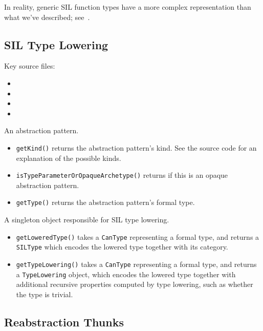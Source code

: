 \documentclass[../generics]{subfiles}
\begin{document}
In reality, generic SIL function types have a more complex representation than what we've described; see~\cite{substfunctype}.

\subsection*{SIL Type Lowering}

Key source files:
\begin{itemize}
\item {}
\item {}
\item {}
\item {}
\end{itemize}

An abstraction pattern.
\begin{itemize}
\item \texttt{getKind()} returns the abstraction pattern's kind. See the source code for an explanation of the possible kinds.
\item \texttt{isTypeParameterOrOpaqueArchetype()} returns if this is an opaque abstraction pattern.
\item \texttt{getType()} returns the abstraction pattern's formal type.
\end{itemize}

A singleton object responsible for SIL type lowering.
\begin{itemize}
\item \texttt{getLoweredType()} takes a \texttt{CanType} representing a formal type, and returns a \texttt{SILType} which encodes the lowered type together with its category.
\item \texttt{getTypeLowering()} takes a \texttt{CanType} representing a formal type, and returns a \texttt{TypeLowering} object, which encodes the lowered type together with additional recursive properties computed by type lowering, such as whether the type is trivial.
\end{itemize}

\subsection*{Reabstraction Thunks}
\end{document}
